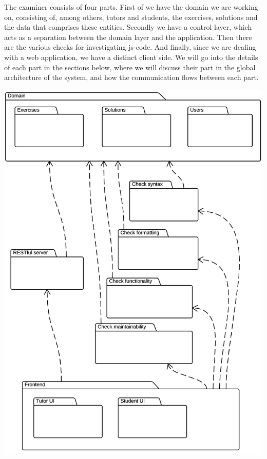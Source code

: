 %

The \gls{examiner} consists of four parts.
First of we have the domain we are working on, consisting of, among others,
tutors and students, the exercises, solutions
and the data that comprises these entities.
Secondly we have a control layer,
which acts as a separation between the domain layer and the application.
Then there are the various checks for investigating \gls{js-code}.
And finally, since we are dealing with a web application,
we have a distinct client side.
We will go into the details of each part in the sections below,
where we will discuss their part in the global architecture of the system,
and how the communication flows between each part.

\includegraphics[scale=0.75]{diagrams-images/architecture}

